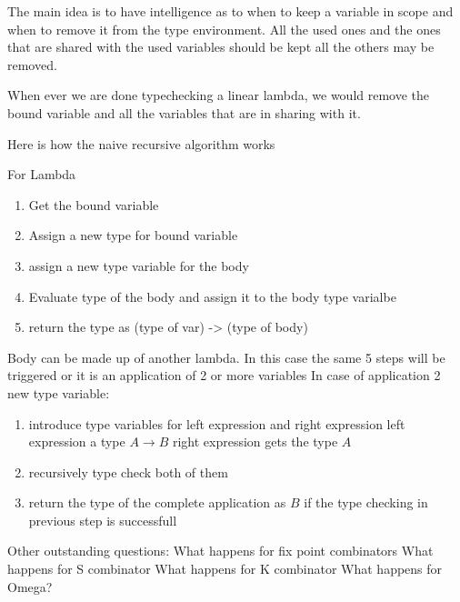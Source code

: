 The main idea is to have intelligence as to when to keep a variable in scope
and when to remove it from the type environment. All the used ones and
the ones that are shared with the used variables should be kept
all the others may be removed.

When ever we are done typechecking a linear lambda, we would remove
the bound variable and all the variables that are in sharing with it.


Here is how the naive recursive algorithm works

For Lambda
\begin{enumerate}
\item Get the bound variable
\item Assign a new type for bound variable
\item assign a new type variable for the body
\item Evaluate type of the body and assign it to the body type varialbe
\item return the type as (type of var) -> (type of body)
\end{enumerate}

Body can be made up of another lambda. In this case the same 5 steps will be triggered
or it is an application of 2 or more variables
In case of application 2 new type variable:
\begin{enumerate}
\item introduce type variables for left expression and right expression
    left expression a type $A \rightarrow B$ right expression gets the type $A$
\item recursively type check both of them
\item return the type of the complete application as $B$ if the type checking in previous step is successfull
\end{enumerate}






Other outstanding questions:
What happens for fix point combinators
What happens for S combinator
What happens for K combinator
What happens for Omega?




